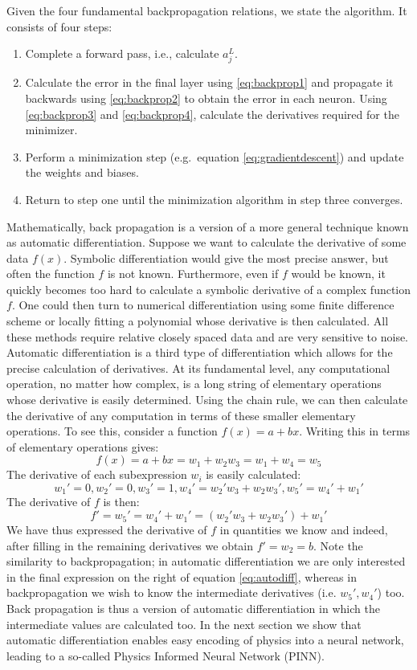 \documentclass{Dissertate}
\providecommand{\tightlist}{%
  \setlength{\itemsep}{0pt}\setlength{\parskip}{0pt}}
\begin{document}
Given the four fundamental backpropagation relations, we state the
algorithm. It consists of four steps:

\begin{enumerate}
\def\labelenumi{\arabic{enumi}.}
\tightlist
\item
  Complete a forward pass, i.e., calculate \(a^L_j\).
\item
  Calculate the error in the final layer using \ref{eq:backprop1}
  and propagate it backwards using \ref{eq:backprop2} to obtain the
  error in each neuron. Using \ref{eq:backprop3} and
  \ref{eq:backprop4}, calculate the derivatives required for the
  minimizer.
\item
  Perform a minimization step (e.g.~equation
  \ref{eq:gradientdescent}) and update the weights and biases.
\item
  Return to step one until the minimization algorithm in step three
  converges.
\end{enumerate}

Mathematically, back propagation is a version of a more general
technique known as automatic differentiation. Suppose we want to
calculate the derivative of some data \(f(x)\). Symbolic differentiation
would give the most precise answer, but often the function \(f\) is not
known. Furthermore, even if \(f\) would be known, it quickly becomes too
hard to calculate a symbolic derivative of a complex function \(f\). One
could then turn to numerical differentiation using some finite
difference scheme or locally fitting a polynomial whose derivative is
then calculated. All these methods require relative closely spaced data
and are very sensitive to noise. Automatic differentiation is a third type of differentiation which allows for
the precise calculation of derivatives. At its
fundamental level, any computational operation, no matter how complex,
is a long string of elementary operations whose derivative is easily
determined. Using the chain rule, we can then calculate the derivative
of any computation in terms of these smaller elementary operations. To
see this, consider a function \(f(x) = a + bx\). Writing this in terms
of elementary operations gives: \[
f(x) = a+bx = w_1+ w_2w_3=w_1+w_4=w_5
\] The derivative of each subexpression \(w_i\) is easily calculated: \[
w_1' = 0, w_2'= 0, w_3'=1,w_4'=w_2'w_3+w_2w_3', w_5'=w_4'+w_1'
\] The derivative of \(f\) is then: \begin{equation}
f' = w_5' = w_4'+w_1' = (w_2'w_3+w_2w_3')+w_1'
\label{eq:autodiff}\end{equation} We have thus expressed the derivative
of \(f\) in quantities we know and indeed, after filling in the
remaining derivatives we obtain \(f' = w_2 =b\). Note the similarity to
backpropagation; in automatic differentiation we are only interested in
the final expression on the right of equation \ref{eq:autodiff},
whereas in backpropagation we wish to know the intermediate derivatives
(i.e. \(w_5', w_4'\)) too. Back propagation is thus a version of
automatic differentiation in which the intermediate values are
calculated too. In the next section we show that automatic
differentiation enables easy encoding of physics into a neural network,
leading to a so-called Physics Informed Neural Network (PINN).
\end{document}
